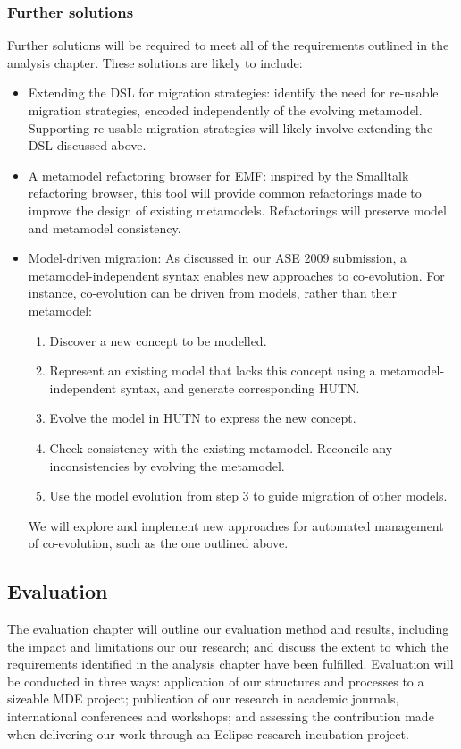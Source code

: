 \subsubsection{Further solutions}
Further solutions will be required to meet all of the requirements outlined in the analysis chapter. These solutions are likely to include:

\begin{itemize}
	\item Extending the DSL for migration strategies: \cite{herrmannsdoerfer08automatability} identify the need for re-usable migration strategies, encoded independently of the evolving metamodel. Supporting re-usable migration strategies will likely involve extending the DSL discussed above. 
	\item A metamodel refactoring browser for EMF: inspired by the Smalltalk refactoring browser, this tool will provide common refactorings made to improve the design of existing metamodels. Refactorings will preserve model and metamodel consistency.
	\item Model-driven migration: As discussed in our ASE 2009 submission, a metamodel-independent syntax enables new approaches to co-evolution. For instance, co-evolution can be driven from models, rather than their metamodel:
	\begin{enumerate}
		\item Discover a new concept to be modelled.
		\item Represent an existing model that lacks this concept using a metamodel-independent syntax, and generate corresponding HUTN.
		\item Evolve the model in HUTN to express the new concept.
		\item Check consistency with the existing metamodel. Reconcile any inconsistencies by evolving the metamodel.
		\item Use the model evolution from step 3 to guide migration of other models.
	\end{enumerate}
	We will explore and implement new approaches for automated management of co-evolution, such as the one outlined above.
\end{itemize}


\subsection{Evaluation}
The evaluation chapter will outline our evaluation method and results, including the impact and limitations our our research; and discuss the extent to which the requirements identified in the analysis chapter have been fulfilled. Evaluation will be conducted in three ways: application of our structures and processes to a sizeable MDE project; publication of our research in academic journals, international conferences and workshops; and assessing the contribution made when delivering our work through an Eclipse research incubation project.

